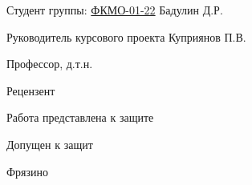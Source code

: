 \begin{center}
\begin{spacing}{1}
        \vspace{2cm}


    \begin{flushleft} Студент группы: \hspace{0.5cm} \underline{ФКМО-01-22} \hspace{2cm} Бадулин Д.Р. \end{flushleft}
    \vspace{0.3cm}
    \begin{flushleft} Руководитель курсового проекта \hspace{2cm} Куприянов П.В. \end{flushleft}
    \begin{flushleft} Профессор, д.т.н.	 \end{flushleft}
    \vspace{0.3cm}
    \begin{flushleft} Рецензент \end{flushleft}
    \vspace{0.5cm}
    \begin{flushleft} Работа представлена к защите \hspace{0.3cm}  \data \end{flushleft}
    \vspace{0.5cm}
    \begin{flushleft} Допущен к защит \hspace{0.3cm}   \data \end{flushleft}
    \vspace{2cm}


\normalsize Фрязино \the\year{}
\end{spacing}
\end{center}


\newpage
\thispagestyle{empty} 

